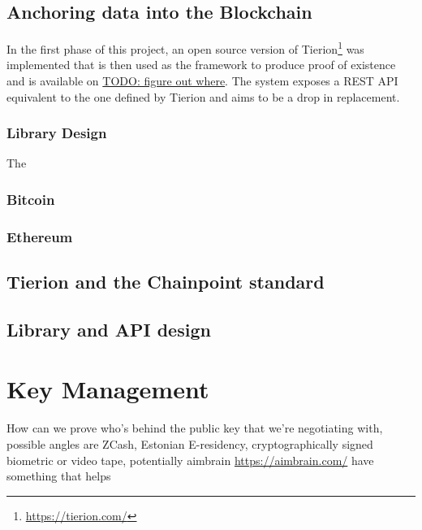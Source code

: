 \documentclass[12pt,msc,a4paper,oneside]{ucl_thesis}
\begin{document}
\section{Anchoring data into the Blockchain} \label{sec:disclosure_anchor_data}
In the first phase of this project, an open source version of Tierion\footnote{\url{https://tierion.com/}} was implemented that is then used as the framework to produce proof of existence and is available on \url{TODO: figure out where}. The system exposes a REST API equivalent to the one defined by Tierion and aims to be a drop in replacement.

\subsection{Library Design}
The

\subsection{Bitcoin}
\subsection{Ethereum}
\section{Tierion and the Chainpoint standard}
\section{Library and API design}

\chapter{Key Management} \label{chapter:key_management}
How can we prove who's behind the public key that we're negotiating with, possible angles are ZCash, Estonian E-residency, cryptographically signed biometric or video tape, potentially aimbrain \url{https://aimbrain.com/} have something that helps
\end{document}
